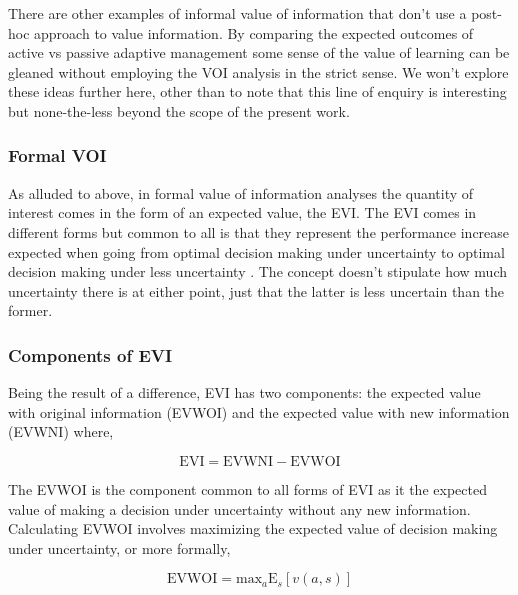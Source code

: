 \documentclass[]{article}
\theoremstyle{definition}
\theoremstyle{definition}
\theoremstyle{definition}
\theoremstyle{remark}
\begin{document}
There are other examples of informal value of information that don't use
a post-hoc approach to value information. By comparing the expected
outcomes of active vs passive adaptive management
\citep[e.g.,][]{Moore2010, Baxter2011} some sense of the value of
learning can be gleaned without employing the VOI analysis in the strict
sense. We won't explore these ideas further here, other than to note
that this line of enquiry is interesting but none-the-less beyond the
scope of the present work.

\subsubsection*{Formal VOI}\label{formal-voi}

As alluded to above, in formal value of information analyses the
quantity of interest comes in the form of an expected value, the EVI.
The EVI comes in different forms but common to all is that they
represent the performance increase expected when going from optimal
decision making under uncertainty to optimal decision making under less
uncertainty \citep{Yokota2004b}. The concept doesn't stipulate how much
uncertainty there is at either point, just that the latter is less
uncertain than the former.

\subsubsection*{Components of EVI}\label{components-of-evi}

Being the result of a difference, EVI has two components: the expected
value with original information (EVWOI) and the expected value with new
information (EVWNI) where,

\begin{equation}
\mathrm{EVI} = \mathrm{EVWNI} - \mathrm{EVWOI}
\label{eq:EVI}
\end{equation}

The EVWOI is the component common to all forms of EVI as it the expected
value of making a decision under uncertainty without any new
information. Calculating EVWOI involves maximizing the expected value of
decision making under uncertainty, or more formally,

\begin{equation}
\mathrm{EVWOI} = \mathrm{max}_a\mathrm{E}_s[{v(a, s)}]
\label{eq:EVWOI}
\end{equation}
\end{document}
